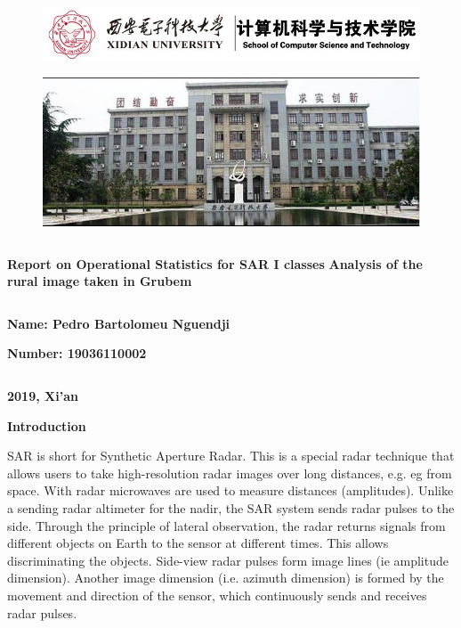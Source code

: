 \documentclass[a4paper,12pt]{report}
\begin{document}
\begin{figure}
\begin{center}
\includegraphics[scale=0.6]{xidianU}
\end{center}
\end{figure}
\begin{figure}[htb]
\begin{center}
\includegraphics[scale=0.4]{xidianU1}
\end{center}
\end{figure}
$$$$
$$$$
$$$$
$$$$
\begin{center}
\textbf{Report on Operational Statistics for SAR I classes}
\textbf{Analysis of the rural image taken in Grubem}
\end{center}
$$$$
$$$$
$$$$

\begin{flushright}
\textbf{Name: Pedro Bartolomeu Nguendji}

\textbf{Number: 19036110002}
\end{flushright}

$$$$


\begin{center}
\textbf{2019, Xi’an}
\end{center}


\begin{flushleft}
\textbf{Introduction}
\end{flushleft}

SAR is short for Synthetic Aperture Radar. This is a special radar technique that allows users to take high-resolution radar images over long distances, e.g. eg from space. With radar microwaves are used to measure distances (amplitudes).
Unlike a sending radar altimeter for the nadir, the SAR system sends radar pulses to the side. Through the principle of lateral observation, the radar returns signals from different objects on Earth to the sensor at different times. This allows discriminating the objects. Side-view radar pulses form image lines (ie amplitude dimension). Another image dimension (i.e. azimuth dimension) is formed by the movement and direction of the sensor, which continuously sends and receives radar pulses.
 
\end{document}
